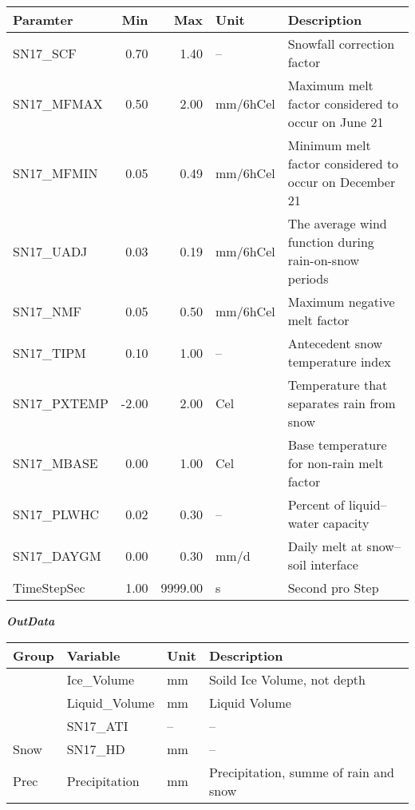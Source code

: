 \documentclass[
]{book}
\begin{document}
\begin{table}[!h]
\centering
\begin{tabular}{l|r|r|l|l}
\hline
Paramter & Min & Max & Unit & Description\\
\hline
SN17\_SCF & 0.70 & 1.40 & -- & Snowfall correction factor\\
\cline{1-5}
SN17\_MFMAX & 0.50 & 2.00 & mm/6hCel & Maximum melt factor considered to occur on June 21\\
\cline{1-5}
SN17\_MFMIN & 0.05 & 0.49 & mm/6hCel & Minimum melt factor considered to occur on December 21\\
\cline{1-5}
SN17\_UADJ & 0.03 & 0.19 & mm/6hCel & The average wind function during rain-on-snow periods\\
\cline{1-5}
SN17\_NMF & 0.05 & 0.50 & mm/6hCel & Maximum negative melt factor\\
\cline{1-5}
SN17\_TIPM & 0.10 & 1.00 & -- & Antecedent snow temperature index\\
\cline{1-5}
SN17\_PXTEMP & -2.00 & 2.00 & Cel & Temperature that separates rain from snow\\
\cline{1-5}
SN17\_MBASE & 0.00 & 1.00 & Cel & Base temperature for non-rain melt factor\\
\cline{1-5}
SN17\_PLWHC & 0.02 & 0.30 & -- & Percent of liquid–water capacity\\
\cline{1-5}
SN17\_DAYGM & 0.00 & 0.30 & mm/d & Daily melt at snow–soil interface\\
\cline{1-5}
TimeStepSec & 1.00 & 9999.00 & s & Second pro Step\\
\hline
\end{tabular}
\end{table}

\textbf{\emph{OutData}}

\begin{table}[!h]
\centering
\begin{tabular}{l|l|l|l}
\hline
Group & Variable & Unit & Description\\
\hline
 & Ice\_Volume & mm & Soild Ice Volume, not depth\\
\cline{2-4}
 & Liquid\_Volume & mm & Liquid Volume\\
\cline{2-4}
 & SN17\_ATI & -- & --\\
\cline{2-4}
\multirow{-4}{*}{\raggedright\arraybackslash Snow} & SN17\_HD & mm & --\\
\cline{1-4}
Prec & Precipitation & mm & Precipitation, summe of rain and snow\\
\hline
\end{tabular}
\end{table}
\end{document}
